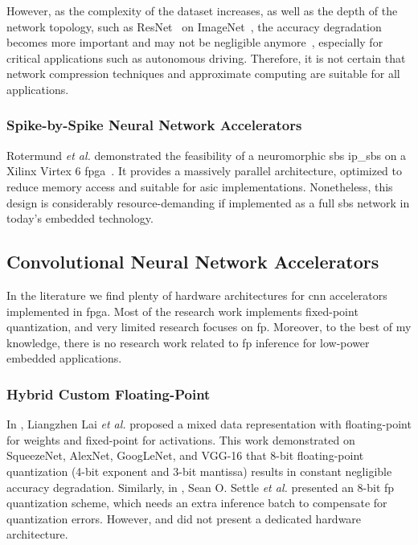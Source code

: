 However, as the complexity of the dataset increases, as well as the depth of the network topology, such as ResNet~\cite{he2016deep} on ImageNet~\cite{russakovsky2015imagenet}, the accuracy degradation becomes more important and may not be negligible anymore~\cite{rastegari2016xnor}, especially for critical applications such as autonomous driving. Therefore, it is not certain that network compression techniques and approximate computing are suitable for all applications.

\subsubsection{Spike-by-Spike Neural Network Accelerators}
Rotermund \textit{et al.} demonstrated the feasibility of a neuromorphic \gls{sbs} \gls{ip_sbs} on a Xilinx Virtex 6 \gls{fpga}~\cite{rotermund2018massively}. It provides a massively parallel architecture, optimized to reduce memory access and suitable for \gls{asic} implementations. Nonetheless, this design is considerably resource-demanding if implemented as a full \gls{sbs} network in today's embedded technology.

\subsection{Convolutional Neural Network Accelerators}
\label{sec:related_work}
In the literature we find plenty of hardware architectures for \gls{cnn} accelerators implemented in \gls{fpga}. Most of the research work implements fixed-point quantization, and very limited research focuses on \gls{fp}. Moreover, to the best of my knowledge, there is no research work related to \gls{fp} inference for low-power embedded applications.


\subsubsection{Hybrid Custom Floating-Point}
In \cite{lai2017deep}, Liangzhen Lai \textit{et al.} proposed a mixed data representation with floating-point for weights and fixed-point for activations. This work demonstrated on SqueezeNet, AlexNet, GoogLeNet, and VGG-16 that 8-bit floating-point quantization (4-bit exponent and 3-bit mantissa) results in constant negligible accuracy degradation. Similarly, in \cite{settle2018quantizing}, Sean O. Settle \textit{et al.} presented an 8-bit \gls{fp} quantization scheme, which needs an extra inference batch to compensate for quantization errors. However, \cite{lai2017deep} and \cite{settle2018quantizing} did not present a dedicated hardware architecture.

